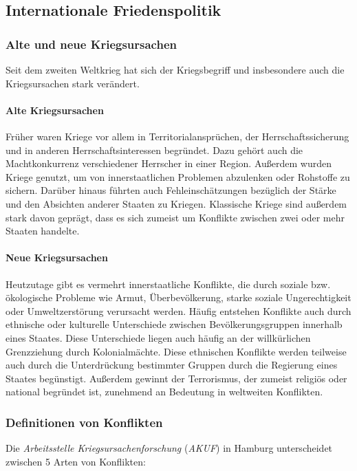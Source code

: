 \documentclass{article}
\begin{document}
	\subsection{Internationale Friedenspolitik}

	\subsubsection{Alte und neue Kriegsursachen}
	Seit dem zweiten Weltkrieg hat sich der Kriegsbegriff und insbesondere auch die Kriegsursachen stark verändert.

	\paragraph{Alte Kriegsursachen}
	Früher waren Kriege vor allem in Territorialansprüchen, der Herrschaftssicherung und in anderen Herrschaftsinteressen begründet. Dazu gehört auch die Machtkonkurrenz verschiedener Herrscher in einer Region. Außerdem wurden Kriege genutzt, um von innerstaatlichen Problemen abzulenken oder Rohstoffe zu sichern. Darüber hinaus führten auch Fehleinschätzungen bezüglich der Stärke und den Absichten anderer Staaten zu Kriegen. Klassische Kriege sind außerdem stark davon geprägt, dass es sich zumeist um Konflikte zwischen zwei oder mehr Staaten handelte.

	\paragraph{Neue Kriegsursachen}
	Heutzutage gibt es vermehrt innerstaatliche Konflikte, die durch soziale bzw. ökologische Probleme wie Armut, Überbevölkerung, starke soziale Ungerechtigkeit oder Umweltzerstörung verursacht werden. Häufig entstehen Konflikte auch durch ethnische oder kulturelle Unterschiede zwischen Bevölkerungsgruppen innerhalb eines Staates. Diese Unterschiede liegen auch häufig an der willkürlichen Grenzziehung durch Kolonialmächte. Diese ethnischen Konflikte werden teilweise auch durch die Unterdrückung bestimmter Gruppen durch die Regierung eines Staates begünstigt. Außerdem gewinnt der Terrorismus, der zumeist religiös oder national begründet ist, zunehmend an Bedeutung in weltweiten Konflikten.

	\subsubsection{Definitionen von Konflikten}
	Die \textit{Arbeitsstelle Kriegsursachenforschung} (\textit{AKUF}) in Hamburg unterscheidet zwischen 5 Arten von Konflikten:
\end{document}

